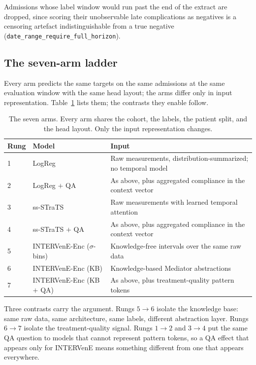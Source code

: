 Admissions whose label window would run past the end of the extract are
dropped, since scoring their unobservable late complications as
negatives is a censoring artefact indistinguishable from a true negative
(\texttt{date\_range\_require\_full\_horizon}).

\subsection{The seven-arm ladder}
\label{sec:methods-ladder}

Every arm predicts the same targets on the same admissions at the same
evaluation window with the same head layout; the arms differ only in
input representation. Table~\ref{tab:ladder-arms} lists them; the
contrasts they enable follow.

\begin{table}[htbp]
\centering
\small
\caption{The seven arms. Every arm shares the cohort, the labels, the
patient split, and the head layout. Only the input representation changes.}
\label{tab:ladder-arms}
\begin{tabularx}{\textwidth}{l>{\raggedright\arraybackslash}p{}>{\raggedright\arraybackslash}X}
\toprule
Rung & Model & Input \\
\midrule
1 & LogReg                      & Raw measurements, distribution-summarized; no temporal model \\
2 & LogReg $+$ QA               & As above, plus aggregated compliance in the context vector \\
3 & ss-STraTS                   & Raw measurements with learned temporal attention \\
4 & ss-STraTS $+$ QA            & As above, plus aggregated compliance in the context vector \\
5 & INTERVenE-Enc ($\sigma$-bins) & Knowledge-free intervals over the same raw data \\
6 & INTERVenE-Enc (KB)          & Knowledge-based Mediator abstractions \\
7 & INTERVenE-Enc (KB $+$ QA)   & As above, plus treatment-quality pattern tokens \\
\bottomrule
\end{tabularx}
\end{table}

Three contrasts carry the argument. Rungs $5 \to 6$ isolate the knowledge
base: same raw data, same architecture, same labels, different
abstraction layer. Rungs $6 \to 7$ isolate the treatment-quality signal.
Rungs $1 \to 2$ and $3 \to 4$ put the same QA question to models that
cannot represent pattern tokens, so a QA effect that appears only for
INTERVenE means something different from one that appears everywhere.

